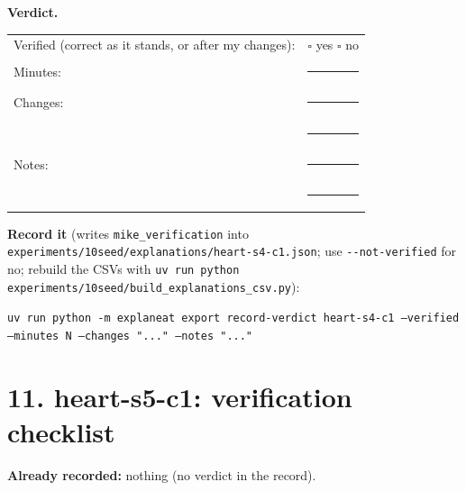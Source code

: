 \documentclass[a4paper,11pt]{article}
\begin{document}
\textbf{Verdict.}

\begin{tabularx}{\linewidth}{@{}lX@{}}
Verified (correct as it stands, or after my changes): & $\square$ yes \quad $\square$ no \\[4pt]
Minutes: & \rule{3cm}{0.4pt} \\[4pt]
Changes: & \rule{\linewidth}{0.4pt} \\[10pt]
 & \rule{\linewidth}{0.4pt} \\[4pt]
Notes: & \rule{\linewidth}{0.4pt} \\[10pt]
 & \rule{\linewidth}{0.4pt} \\
\end{tabularx}

\textbf{Record it} (writes \texttt{mike\_verification} into \texttt{experiments/10seed/explanations/heart-s4-c1.json}; use \texttt{-{}-not-verified} for no; rebuild the CSVs with \texttt{uv run python experiments/10seed/build\_explanations\_csv.py}):

{\footnotesize\raggedright\texttt{uv run python -m explaneat export record-verdict heart-s4-c1 --verified --minutes N --changes "..." --notes "..."}\par}


\clearpage
















\clearpage
\section*{11. heart-s5-c1: verification checklist}
\label{rev:heart-s5-c1}
\textbf{Already recorded:} nothing (no verdict in the record).
\end{document}
